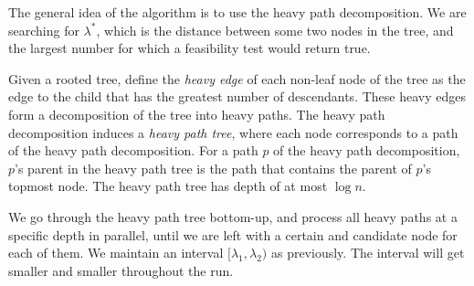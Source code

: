 \documentclass[a4paper,UKenglish]{lipics-v2016}
\theoremstyle{plain}
\begin{document}
The general idea of the algorithm is to use the heavy path decomposition. We are searching for $\lambda^*$, which is the distance between some two nodes in the tree, and the largest number for which a feasibility test would return true.
\begin{definition} \cite{Sleator1983} Given a rooted tree, define the \emph{heavy edge} of each non-leaf node of the tree as the edge to the child that has the greatest number of descendants. These heavy edges form a decomposition of the tree into heavy paths. The heavy path decomposition induces a \emph{heavy path tree}, where each node corresponds to a path of the heavy path decomposition. For a path $p$ of the heavy path decomposition, $p$'s parent in the heavy path tree is the path that contains the parent of $p$'s topmost node. The heavy path tree has depth of at most $\log n$. 
\end{definition}
We go through the heavy path tree bottom-up, and process all heavy paths at a specific depth in parallel, until we are left with a certain and candidate node for each of them. We maintain an interval $[\lambda_1,\lambda_2)$ as previously. The interval will get smaller and smaller throughout the run.
\end{document}
